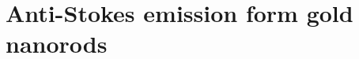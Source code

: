 \documentclass[journal=nalefd,manuscript=letter]{achemso}
\newcommand{\K}{\ensuremath{\,\textrm{K}}}
\begin{document}
% 
% 
% 

\section{Anti-Stokes emission form gold nanorods}\label{sec:AS}
\end{document}
